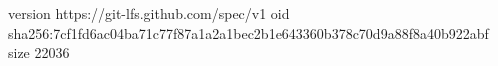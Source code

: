 version https://git-lfs.github.com/spec/v1
oid sha256:7cf1fd6ac04ba71c77f87a1a2a1bec2b1e643360b378c70d9a88f8a40b922abf
size 22036

